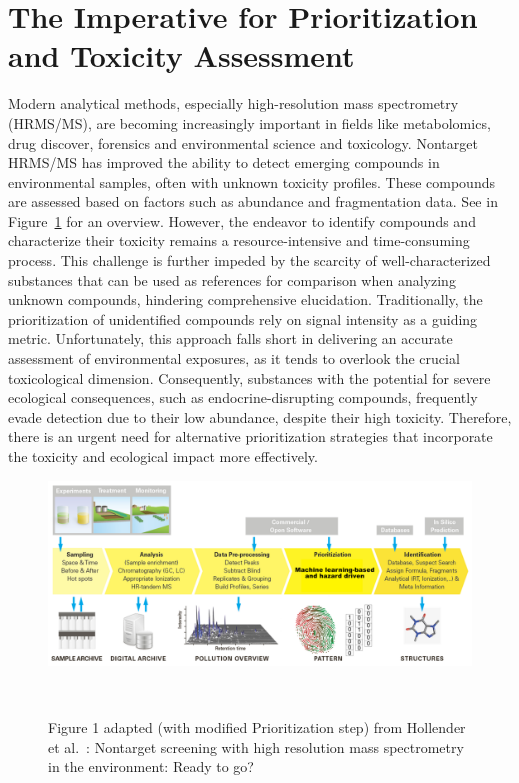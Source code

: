 \section{The Imperative for Prioritization and Toxicity Assessment}

Modern analytical methods, especially high-resolution mass spectrometry (HRMS/MS), are becoming increasingly important in fields like metabolomics, drug discover, forensics and environmental science and toxicology. Nontarget HRMS/MS has improved the ability to detect emerging compounds in environmental samples, often with unknown toxicity profiles. These compounds are assessed based on factors such as abundance and fragmentation data. See in Figure~\ref{fig:non_target_high_resolution_mass_spectrometry} for an overview. However, the endeavor to identify compounds and characterize their toxicity remains a resource-intensive and time-consuming process. This challenge is further impeded by the scarcity of well-characterized substances that can be used as references for comparison when analyzing unknown compounds, hindering comprehensive elucidation. Traditionally, the prioritization of unidentified compounds rely on signal intensity as a guiding metric. Unfortunately, this approach falls short in delivering an accurate assessment of environmental exposures, as it tends to overlook the crucial toxicological dimension. Consequently, substances with the potential for severe ecological consequences, such as endocrine-disrupting compounds, frequently evade detection due to their low abundance, despite their high toxicity. Therefore, there is an urgent need for alternative prioritization strategies that incorporate the toxicity and ecological impact more effectively.

\begin{figure}[htbp]  %
    \centering
    \includegraphics[width=1.0\textwidth]{figures/non_target_high_resolution_mass_spectrometry_1.png}  
    \caption{Figure 1 adapted (with modified Prioritization step) from Hollender et al.~\cite{hollender}: Nontarget screening with high resolution mass spectrometry in the environment: Ready to go? }
~\label{fig:non_target_high_resolution_mass_spectrometry} 
\end{figure}

